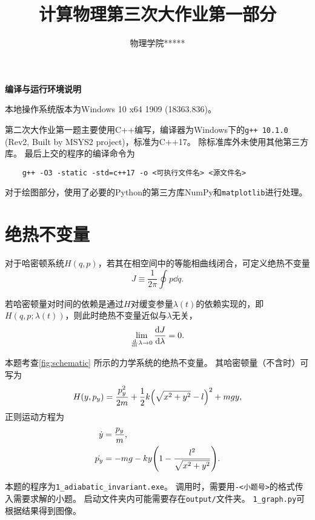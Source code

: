 \documentclass[a4paper,unicode]{report}
\title{计算物理第三次大作业第一部分}
\author{物理学院\quad ***\quad 1800011***}
\begin{document}
\maketitle
\tableofcontents

\begin{center}
    \textbf{编译与运行环境说明}
\end{center}

本地操作系统版本为\textsf{Windows 10 x64 1909 (18363.836)}。

第二次大作业第一题主要使用\textsf{C++}编写，编译器为Windows下的\texttt{g++ 10.1.0} (Rev2, Built by MSYS2 project)，标准为\textsf{C++17}。
除标准库外未使用其他第三方库。
最后上交的程序的编译命令为\begin{verbatim}
    g++ -O3 -static -std=c++17 -o <可执行文件名> <源文件名>
\end{verbatim}

对于绘图部分，使用了必要的\textsf{Python}的第三方库\textsf{NumPy}和\texttt{matplotlib}进行处理。

\chapter{绝热不变量}

对于哈密顿系统$H(q,p)$，若其在相空间中的等能相曲线闭合，可定义绝热不变量
\begin{equation}
    J\equiv \frac{1}{2\pi}\oint p\dd q.
\end{equation}

若哈密顿量对时间的依赖是通过$H$对缓变参量$\lambda(t)$的依赖实现的，即$H(q,p;\lambda(t))$，则此时绝热不变量近似与$\lambda$无关，
\begin{equation}
    \lim_{\dv{t}\lambda\to 0}\dv{J}{\lambda} = 0.
\end{equation}

本题考查\autoref{fig:schematic} 所示的力学系统的绝热不变量。
其哈密顿量（不含时）可写为
\begin{equation}
    H(y, p_y) = \frac{p_y^2}{2m} + \frac{1}{2}k\qty(\sqrt{x^2+y^2} - l)^2 + mgy,
\end{equation}
正则运动方程为
\begin{subequations}\label{eq:canonical_eq}
\begin{align}
    \dot{y} &{}= \frac{p_y}{m},\\
    \dot{p_y} &{}= -mg-ky\qty(1-\frac{l^2}{\sqrt{x^2+y^2}}).
\end{align}
\end{subequations}

本题的程序为\verb|1_adiabatic_invariant.exe|。
调用时，需要用\verb|-<小题号>|的格式传入需要求解的小题。
启动文件夹内可能需要存在\verb|output/|文件夹。
\verb|1_graph.py|可根据结果得到图像。
\end{document}
